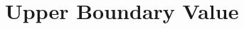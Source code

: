 \documentclass[../dissertation.tex]{subfiles}
\begin{document}
\section{Upper Boundary Value}\label{sec2.3:UpperBndry}
\end{document}
